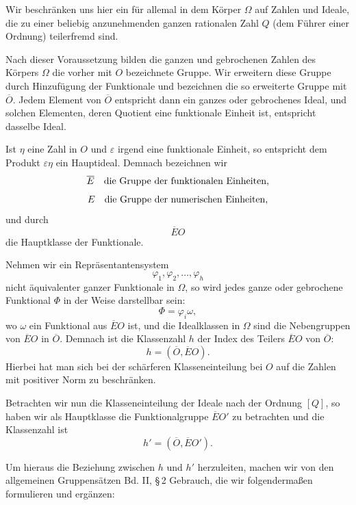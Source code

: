 \documentclass[11pt]{article}
\begin{document}
Wir beschränken uns hier ein für allemal in dem Körper \(\Omega\) auf Zahlen und Ideale, die zu einer beliebig anzunehmenden ganzen rationalen Zahl \(Q\) (dem Führer einer Ordnung) teilerfremd sind.

Nach dieser Voraussetzung bilden die ganzen und gebrochenen Zahlen des Körpers \(\Omega\) die vorher mit \(O\) bezeichnete Gruppe. Wir erweitern diese Gruppe durch Hinzufügung der Funktionale und bezeichnen die so erweiterte Gruppe mit \(\overline O\). Jedem Element von \(\overline O\) entspricht dann ein ganzes oder gebrochenes Ideal, und solchen Elementen, deren Quotient eine funktionale Einheit ist, entspricht dasselbe Ideal.

Ist \(\eta\) eine Zahl in \(O\) und \(\varepsilon\) irgend eine funktionale Einheit, so entspricht dem Produkt \(\varepsilon\eta\) ein Hauptideal. Demnach bezeichnen wir
\[
 \overline E\quad\hbox{die Gruppe der funktionalen Einheiten,}
\]
\[
 E\quad\hbox{die Gruppe der numerischen Einheiten,}
\]
und durch
\[
 \overline EO
\]
die Hauptklasse der Funktionale.

Nehmen wir ein Repräsentantensystem
\begin{equation}
 \varphi_1,\varphi_2,\ldots,\varphi_h
\tag{1}
\end{equation}
nicht äquivalenter ganzer Funktionale in \(\Omega\), so wird jedes ganze oder gebrochene Funktional \(\Phi\) in der Weise darstellbar sein:
\[
 \Phi=\varphi_i\omega,
\]
wo \(\omega\) ein Funktional aus \(\overline EO\) ist, und die Idealklassen in \(\Omega\) sind die Nebengruppen von \(\overline EO\) in \(\overline O\). Demnach ist die Klassenzahl \(h\) der Index des Teilers \(\overline EO\) von \(\overline O\):
\begin{equation}
 h=(\overline O,\overline EO).
\tag{2}
\end{equation}
Hierbei hat man sich bei der schärferen Klasseneinteilung bei \(O\) auf die Zahlen mit positiver Norm zu beschränken.

Betrachten wir nun die Klasseneinteilung der Ideale nach der Ordnung \([Q]\), so haben wir als Hauptklasse die Funktionalgruppe \(\overline EO'\) zu betrachten und die Klassenzahl ist
\begin{equation}
 h'=(\overline O,\overline EO').
\tag{3}
\end{equation}

Um hieraus die Beziehung zwischen \(h\) und \(h'\) herzuleiten, machen wir von den allgemeinen Gruppensätzen Bd. II, \S\,2 Gebrauch, die wir folgendermaßen formulieren und ergänzen:
\end{document}
